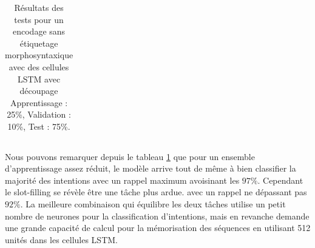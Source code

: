 \begin{table}[H]
{\begin{tabular}{|c|c|c|c|c|c|c|c|c|}
			\end{tabular}%
		}
		\caption{Résultats des tests pour un encodage sans étiquetage morphosyntaxique avec des cellules LSTM avec découpage Apprentissage : 25\%, Validation : 10\%, Test : 75\%.}
		\label{tab:lstm_1}
	\end{table}
	
	\paragraph{}
	Nous pouvons remarquer depuis le tableau \ref{tab:lstm_1} que pour un ensemble d'apprentissage assez réduit, le modèle arrive tout de même à bien classifier la majorité des intentions avec un rappel maximum avoisinant les $97\%$. Cependant le slot-filling se révèle être une tâche plus ardue. avec un rappel ne dépassant pas $92\%$. La meilleure combinaison qui équilibre les deux tâches utilise un petit nombre de neurones pour la classification d'intentions, mais en revanche demande une grande capacité de calcul pour la mémorisation des séquences en utilisant 512 unités dans les cellules LSTM.
	
